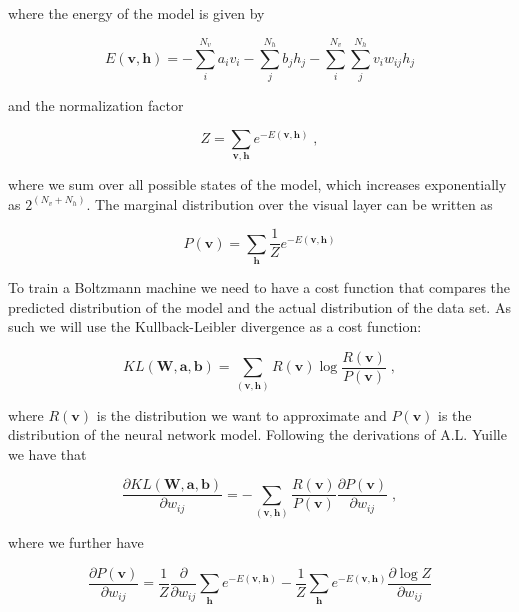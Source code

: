 where the energy of the model is given by

\begin{equation}
    E(\boldsymbol{v},\boldsymbol{h}) = -\sum_i^{N_v} a_i v_i - \sum_j^{N_h} b_j h_j -\sum_i^{N_v} \sum_j^{N_h} v_i w_{ij} h_j
\end{equation}

and the normalization factor

\begin{equation}
    Z = \sum_{ \boldsymbol{v}, \boldsymbol{h}} e^{-E(\boldsymbol{v},\boldsymbol{h})} \; ,
\end{equation}

where we sum over all possible states of the model, which increases exponentially as $2^{(N_v + N_h)}$. The marginal distribution over the visual layer can be written as

\begin{equation}
    P(\boldsymbol{v}) = \sum_{\boldsymbol{h}} \frac{1}{Z} e^{-E(\boldsymbol{v}, \boldsymbol{h})}
\end{equation}

To train a Boltzmann machine we need to have a cost function that compares the predicted distribution of the model and the actual distribution of the data set. As such we will use the Kullback-Leibler divergence as a cost function:

\begin{equation}
    KL(\boldsymbol{W}, \boldsymbol{a}, \boldsymbol{b}) = \sum_{(\boldsymbol{v}, \boldsymbol{h})} R(\boldsymbol{v}) \log{\frac{R(\boldsymbol{v})}{P(\boldsymbol{v})}} \; ,
\end{equation}

where $R(\boldsymbol{v})$ is the distribution we want to approximate and $P(\boldsymbol{v})$ is the distribution of the neural network model. Following the derivations of A.L. Yuille \cite{boltzderv} we have that

\begin{equation}\label{eq:costderv}
    \frac{ \partial KL(\boldsymbol{W}, \boldsymbol{a}, \boldsymbol{b})}{\partial w_{ij}} = - \sum_{(\boldsymbol{v}, \boldsymbol{h})} \frac{ R(\boldsymbol{v})}{P( \boldsymbol{v})} \frac{\partial P( \boldsymbol{v})}{\partial w_{ij}} \; ,
\end{equation}

where we further have

\begin{equation}
    \frac{\partial P(\boldsymbol{v})}{\partial w_{ij}} = \frac{1}{Z} \frac{\partial}{\partial w_{ij}} \sum_{\boldsymbol{h}} e^{-E(\boldsymbol{v}, \boldsymbol{h})} - \frac{1}{Z}  \sum_{\boldsymbol{h}} e^{-E(\boldsymbol{v}, \boldsymbol{h})} \frac{\partial \log{Z} }{\partial w_{ij}}
\end{equation}

